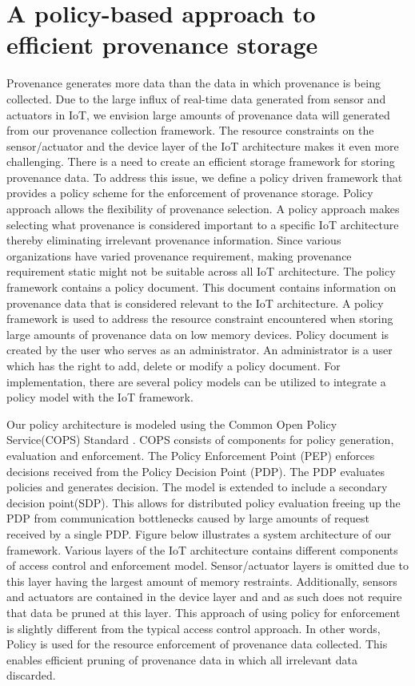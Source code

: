 \section{A policy-based approach to efficient provenance storage}
\par Provenance generates more data than the data in which provenance is being collected. Due to the large influx of real-time data generated from sensor and actuators in IoT, we envision large amounts of provenance data will generated from our provenance collection framework. The resource constraints on the sensor/actuator and the device layer of the IoT architecture makes it even more challenging. There is a need to create an efficient storage framework for storing provenance data. To address this issue, we define a policy driven framework that provides a policy scheme for the enforcement of provenance storage. Policy approach allows the flexibility of provenance selection. A policy approach makes selecting what provenance is considered important to a specific IoT architecture thereby eliminating irrelevant provenance information. Since various organizations have varied provenance requirement, making provenance requirement static might not be suitable across all IoT architecture. The policy framework contains a policy document. This document contains information on provenance data that is considered relevant to the IoT architecture. A policy framework is used to address the resource constraint encountered when storing large amounts of provenance data on low memory devices. Policy document is created by the user who serves as an administrator.  An administrator is a user which has the right to add, delete or modify a policy document. For implementation, there are several policy models can be utilized to integrate a policy model  with the IoT framework. 

\par Our policy architecture is modeled using the Common Open Policy Service(COPS) Standard \cite{rfc2748}. COPS consists of components for policy generation, evaluation and enforcement. The Policy Enforcement Point (PEP) enforces decisions received from the Policy Decision Point (PDP). The PDP evaluates policies and generates decision. The model is extended to include a secondary decision point(SDP). This allows for distributed policy evaluation freeing up the PDP from communication bottlenecks caused by large amounts of request received by a single PDP. Figure below illustrates a system architecture of our framework. Various layers of the IoT architecture contains different components of access control and enforcement model. Sensor/actuator layers is omitted due to this layer having the largest amount of memory restraints. Additionally, sensors and actuators are contained in the device layer and and as such does not require that data be pruned at this layer. This approach of using policy for enforcement is slightly different from the typical access control approach. In other words, Policy is used for the resource enforcement of provenance data collected. This enables efficient pruning of provenance data in which all irrelevant data discarded. 

